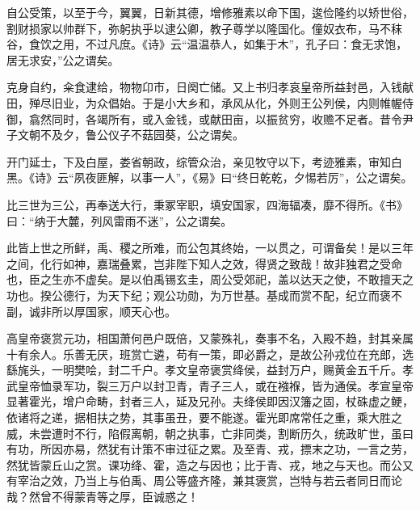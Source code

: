\documentclass[12pt,UTF8]{ctexbook}
\begin{document}
自公受策，以至于今，翼翼，日新其德，增修雅素以命下国，逡俭隆约以矫世俗，割财损家以帅群下，弥躬执乎以逮公卿，教子尊学以隆国化。僮奴衣布，马不秣谷，食饮之用，不过凡庶。《诗》云“温温恭人，如集于木”，孔子曰：食无求饱，居无求安，”公之谓矣。



克身自约，籴食逮给，物物卬市，日阕亡储。又上书归孝哀皇帝所益封邑，入钱献田，殚尽旧业，为众倡始。于是小大乡和，承风从化，外则王公列侯，内则帷幄侍御，翕然同时，各竭所有，或入金钱，或献田亩，以振贫穷，收赡不足者。昔令尹子文朝不及夕，鲁公仪子不菇园葵，公之谓矣。



开门延士，下及白屋，娄省朝政，综管众治，亲见牧守以下，考迹雅素，审知白黑。《诗》云“夙夜匪解，以事一人”，《易》曰“终日乾乾，夕惕若厉”，公之谓矣。



比三世为三公，再奉送大行，秉冢宰职，填安国家，四海辐凑，靡不得所。《书》曰：“纳于大麓，列风雷雨不迷”，公之谓矣。



此皆上世之所鲜，禹、稷之所难，而公包其终始，一以贯之，可谓备矣！是以三年之间，化行如神，嘉瑞叠累，岂非陛下知人之效，得贤之致哉！故非独君之受命也，臣之生亦不虚矣。是以伯禹锡玄圭，周公受郊祀，盖以达天之使，不敢擅天之功也。揆公德行，为天下纪；观公功勋，为万世基。基成而赏不配，纪立而褒不副，诚非所以厚国家，顺天心也。



高皇帝褒赏元功，相国萧何邑户既倍，又蒙殊礼，奏事不名，入殿不趋，封其亲属十有余人。乐善无厌，班赏亡遴，苟有一策，即必爵之，是故公孙戎位在充郎，选繇旄头，一明樊哙，封二千户。孝文皇帝褒赏绛侯，益封万户，赐黄金五千斤。孝武皇帝恤录军功，裂三万户以封卫青，青子三人，或在襁褓，皆为通侯。孝宣皇帝显著霍光，增户命畴，封者三人，延及兄孙。夫绛侯即因汉籓之固，杖硃虚之鲠，依诸将之递，据相扶之势，其事虽丑，要不能遂。霍光即席常任之重，乘大胜之威，未尝遭时不行，陷假离朝，朝之执事，亡非同类，割断历久，统政旷世，虽曰有功，所因亦易，然犹有计策不审过征之累。及至青、戎，摽末之功，一言之劳，然犹皆蒙丘山之赏。课功绛、霍，造之与因也；比于青、戎，地之与天也。而公又有宰治之效，乃当上与伯禹、周公等盛齐隆，兼其褒赏，岂特与若云者同日而论哉？然曾不得蒙青等之厚，臣诚惑之！
\end{document}
